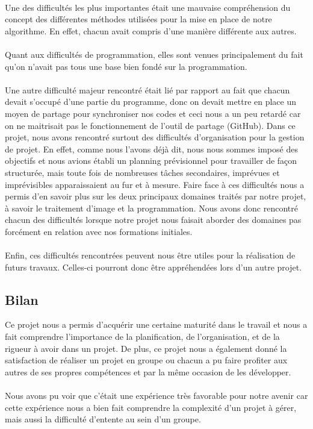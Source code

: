 \paragraph{}
Une des difficultés les plus importantes était une mauvaise compréhension du concept des différentes méthodes utilisées pour la mise en place de notre algorithme. En effet, chacun avait compris d’une manière différente aux autres.
\paragraph{}
Quant aux difficultés de programmation, elles sont venues principalement du fait qu’on n’avait pas tous une base bien fondé sur la programmation.
\paragraph{}
Une autre difficulté majeur rencontré était lié par rapport au fait que chacun devait s’occupé d’une partie du programme, donc on devait mettre en place un moyen de partage pour synchroniser nos codes et ceci nous a un peu retardé car on ne maitrisait pas le fonctionnement de l’outil de partage (GitHub).
Dans ce projet, nous avons rencontré surtout des difficultés d'organisation pour la gestion de projet. En effet, comme nous l’avons déjà dit, nous nous sommes imposé des objectifs et nous avions établi un planning prévisionnel pour travailler de façon structurée, mais toute fois de nombreuses tâches secondaires, imprévues et imprévisibles apparaissaient au fur et à mesure.
Faire face à ces difficultés nous a permis d'en savoir plus sur les deux principaux domaines traités par notre projet, à savoir le traitement d’image et la programmation. Nous avons donc rencontré chacun des difficultés lorsque notre projet nous faisait aborder des domaines pas forcément en relation avec nos formations initiales. 
\paragraph{}
Enfin, ces difficultés rencontrées peuvent nous être utiles pour la réalisation de futurs travaux. Celles-ci pourront donc être appréhendées lors d'un autre projet.

\subsection{Bilan}

Ce projet nous a permis d’acquérir une certaine maturité dans le travail et nous a fait comprendre l’importance de la planification, de l’organisation, et de la rigueur à avoir dans un projet. De plus, ce projet nous a également donné la satisfaction de réaliser un projet en groupe ou chacun a pu faire profiter aux autres de ses propres compétences et par la même occasion de les développer.
\paragraph{}
Nous avons pu voir que c'était une expérience très favorable pour notre avenir car cette
expérience nous a bien fait comprendre la complexité d’un projet à gérer, mais aussi la difficulté d’entente au sein d’un groupe.